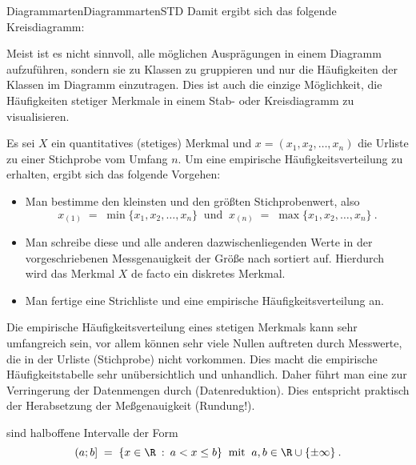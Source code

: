 \begin{MXContent}{Diagrammarten}{Diagrammarten}{STD}
Damit ergibt sich das folgende Kreisdiagramm:

\begin{center}
\end{center}

Meist ist es nicht sinnvoll, alle möglichen Ausprägungen in einem Diagramm aufzuführen, sondern sie zu Klassen zu gruppieren und nur die Häufigkeiten der Klassen im Diagramm einzutragen.
Dies ist auch die einzige Möglichkeit, die Häufigkeiten stetiger Merkmale in einem Stab- oder Kreisdiagramm zu visualisieren.

Es sei $X$ ein quantitatives (stetiges) Merkmal und $x=(x_{1},x_{2},\ldots ,x_{n})$ die Urliste zu einer Stichprobe vom Umfang $n$.
Um eine empirische Häufigkeitsverteilung zu erhalten, ergibt sich das folgende Vorgehen:
\begin{itemize}
\item{Man bestimme den kleinsten und den größten Stichprobenwert, also
$$
x_{(1)} \; =\; \min\lbrace x_{1},x_{2},\ldots ,x_{n}\rbrace\;\; \text{und}\;\;
x_{(n)} \; =\; \max\lbrace x_{1},x_{2},\ldots ,x_{n}\rbrace\: .
$$}
\item{Man schreibe diese und alle anderen dazwischenliegenden Werte in der vorgeschriebenen Messgenauigkeit der Größe nach sortiert auf.
Hierdurch wird das Merkmal $X$ de facto ein diskretes Merkmal.}
\item{Man fertige eine Strichliste und eine empirische Häufigkeitsverteilung an.}
\end{itemize}

Die empirische Häufigkeitsverteilung eines stetigen Merkmals kann sehr umfangreich sein, vor allem können sehr viele Nullen auftreten
durch Messwerte, die in der Urliste (Stichprobe) nicht vorkommen. Dies macht die empirische Häufigkeitstabelle sehr
unübersichtlich und unhandlich. Daher führt man eine  zur Verringerung der Datenmengen durch (Datenreduktion).
Dies entspricht praktisch der Herabsetzung der Meßgenauigkeit (Rundung!).

\begin{MInfo}
 sind halboffene Intervalle der Form
$$
(a;b]\; =\; \lbrace x\in\R\:  : \: a<x\leq b\rbrace\;\; \text{mit}\;\; a,b\in \R\cup\lbrace\pm \infty\rbrace\: .
$$
\end{MInfo}


\end{MXContent}
